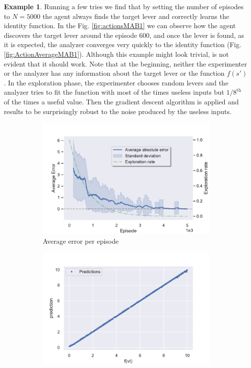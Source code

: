 \documentclass[11pt,a4paper,twoside]{report}
\newcommand{\+}{\textnormal{+} }
\theoremstyle{definition}
\newtheorem{myex}[mythm]{Example}
\numberwithin{equation}{chapter}
\begin{document}
\begin{myex}
    Running a few tries we find that by setting the number of episodes to
    $N=5000$ the agent always finds the target lever and correctly learns the
    identity function. In the Fig. \ref{fig:actionsMAB1} we can observe how the
    agent discovers the target lever around the episode 600, and once the lever
    is found, as it is expected, the analyzer converges very quickly to the
    identity function (Fig. \ref{fig:ActionAverageMAB1}). Although this example
    might look trivial, is not evident that it should work. Note that at
    the beginning, neither the experimenter or the analyzer has any information
    about the target lever or the function $f(s')$. In the exploration phase,
    the experimenter chooses random levers and the analyzer tries to fit the
    function with most of the times useless inputs but $1/8^{\text{th}}$ of the
    times a useful value. Then the gradient descent algorithm is applied and
    results to be surprisingly robust to the noise produced by the useless inputs.
    \begin{figure}[]
      \centering
      \begin{subfigure}{.5\textwidth}
        \centering
        \includegraphics[width=1\linewidth]{figures/Error-MAB1.pdf}
        \caption{Average error per episode}
        \label{fig:ErrorAverageMAB1}
      \end{subfigure}%
      \begin{subfigure}{.5\textwidth}
        \centering
        \includegraphics[width=1\linewidth]{figures/predictions-MAB1.pdf}

\end{subfigure}
\end{figure}
\end{myex}
\end{document}
